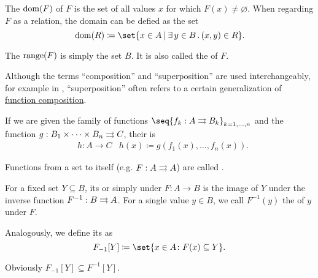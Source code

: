 \begin{definition}
\begin{thmenum}[resume=def:multi_valued_function]
     The  \( \operatorname{dom}(F) \) of \( F \) is the set of all values \( x \) for which \( F(x) \neq \varnothing \). When regarding \( F \) as a relation, the domain can be defied as the set
    \begin{equation*}
      \dom(R) \coloneqq \set{ x \in A \given \qexists {y \in B} (x, y) \in R }.
    \end{equation*}

     The  \( \operatorname{range}(F) \) is simply the set \( B \). It is also called the  of \( F \).

     Although the terms \enquote{composition} and \enquote{superposition} are used interchangeably, for example in \cite[]{Фихтенгольц1968Том1}, \enquote{superposition} often refers to a certain generalization of \hyperref[def:multi_valued_function/composition]{function composition}.

    If we are given the family of functions \( \seq{ f_k: A \multto B_k }_{k = 1, \ldots, n} \) and the function \( g: B_1 \times \cdots \times B_n \rightrightarrows C \), their  is
    \begin{equation*}
      \begin{aligned}
        &h: A \to C
        &h(x) \coloneqq g(f_1(x), \ldots, f_n(x)).
      \end{aligned}
    \end{equation*}

     Functions from a set to itself (e.g. \( F: A \rightrightarrows A \)) are called .

     For a fixed set \( Y \subseteq B \), its  or simply  under \( F: A \to B \) is the image of \( Y \) under the inverse function \( F^{-1}: B \rightrightarrows A \). For a single value \( y \in B \), we call \( F^{-1}(y) \) the  of \( y \) under \( F \).

     Analogously, we define its  as
    \begin{equation*}
      F_{-1}[Y] \coloneqq \set{ x \in A \colon F(x) \subseteq Y }.
    \end{equation*}

    Obviously \( F_{-1}[Y] \subseteq F^{-1}[Y] \).
  \end{thmenum}
\end{definition}

